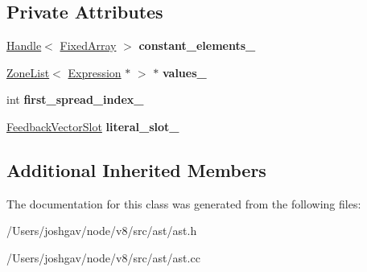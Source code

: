 \subsection*{Private Attributes}
\begin{DoxyCompactItemize}
\item 
\hyperlink{classv8_1_1internal_1_1_handle}{Handle}$<$ \hyperlink{classv8_1_1internal_1_1_fixed_array}{Fixed\+Array} $>$ {\bfseries constant\+\_\+elements\+\_\+}\hypertarget{classv8_1_1internal_1_1_array_literal_aa6ca241065a0919b44d8f3894ebff497}{}\label{classv8_1_1internal_1_1_array_literal_aa6ca241065a0919b44d8f3894ebff497}

\item 
\hyperlink{classv8_1_1internal_1_1_zone_list}{Zone\+List}$<$ \hyperlink{classv8_1_1internal_1_1_expression}{Expression} $\ast$ $>$ $\ast$ {\bfseries values\+\_\+}\hypertarget{classv8_1_1internal_1_1_array_literal_a8c4b703d6c85e025282b042923cd0ce2}{}\label{classv8_1_1internal_1_1_array_literal_a8c4b703d6c85e025282b042923cd0ce2}

\item 
int {\bfseries first\+\_\+spread\+\_\+index\+\_\+}\hypertarget{classv8_1_1internal_1_1_array_literal_a270009f1ea0ef63edd4169dd393729aa}{}\label{classv8_1_1internal_1_1_array_literal_a270009f1ea0ef63edd4169dd393729aa}

\item 
\hyperlink{classv8_1_1internal_1_1_feedback_vector_slot}{Feedback\+Vector\+Slot} {\bfseries literal\+\_\+slot\+\_\+}\hypertarget{classv8_1_1internal_1_1_array_literal_a1d2a45605cbf6b732e2bfc3df748305c}{}\label{classv8_1_1internal_1_1_array_literal_a1d2a45605cbf6b732e2bfc3df748305c}

\end{DoxyCompactItemize}
\subsection*{Additional Inherited Members}


The documentation for this class was generated from the following files\+:\begin{DoxyCompactItemize}
\item 
/\+Users/joshgav/node/v8/src/ast/ast.\+h\item 
/\+Users/joshgav/node/v8/src/ast/ast.\+cc\end{DoxyCompactItemize}

